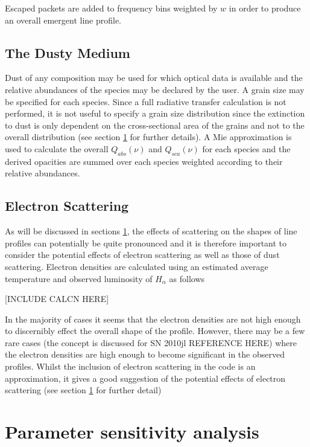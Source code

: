 \documentclass[useAMS,usenatbib]{mn2e}
\begin{document}
Escaped packets are added to frequency bins weighted by $w$ in order to produce an overall emergent line profile.

\subsection{The Dusty Medium}

Dust of any composition may be used for which optical data is available and the relative abundances of the species may be declared by the user.  A grain size may be specified for each species.  Since a full radiative transfer calculation is not performed, it is not useful to specify a grain size distribution since the extinction to dust is only dependent on the cross-sectional area of the grains and not to the overall distribution (see section \ref{params} for further details).  A Mie approximation is used to calculate the overall $Q_{abs}(\nu)$ and $Q_{sca}(\nu)$ for each species and the derived opacities are summed over each species weighted according to their relative abundances. 

\subsection{Electron Scattering}

As will be discussed in sections \ref{params}, the effects of scattering on the shapes of line profiles can potentially be quite pronounced and it is therefore important to consider the potential effects of electron scattering as well as those of dust scattering.  Electron densities are calculated using an estimated average temperature and observed luminosity of $H_{\alpha}$ as follows

[INCLUDE CALCN HERE]

In the majority of cases it seems that the electron densities are not high enough to discernibly effect the overall shape of the profile.  However, there may be a few rare cases (the concept is discussed for SN 2010jl REFERENCE HERE) where the electron densities are high enough to become significant in the observed profiles.  Whilst the inclusion of electron scattering in the code is an approximation, it gives a good suggestion of the potential effects of electron scattering (see section \ref{params} for further detail)

\section{Parameter sensitivity analysis}
\label{params}
\end{document}
